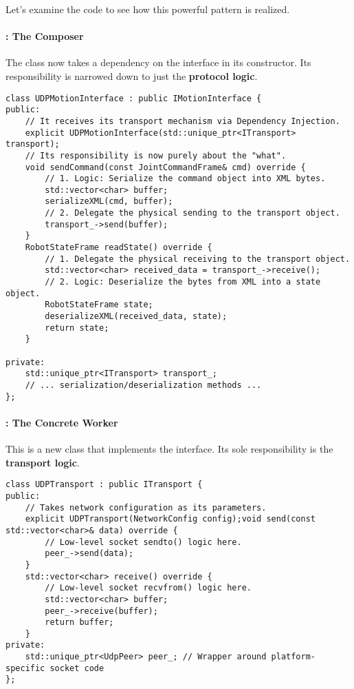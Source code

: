 Let's examine the code to see how this powerful pattern is realized.

\paragraph{: The Composer}
The  class now takes a dependency on the  interface in its constructor. Its responsibility is narrowed down to just the \textbf{protocol logic}.

\begin{verbatim}
class UDPMotionInterface : public IMotionInterface {
public:
    // It receives its transport mechanism via Dependency Injection.
    explicit UDPMotionInterface(std::unique_ptr<ITransport> transport);
    // Its responsibility is now purely about the "what".
    void sendCommand(const JointCommandFrame& cmd) override {
        // 1. Logic: Serialize the command object into XML bytes.
        std::vector<char> buffer;
        serializeXML(cmd, buffer);
        // 2. Delegate the physical sending to the transport object.
        transport_->send(buffer);
    }
    RobotStateFrame readState() override {
        // 1. Delegate the physical receiving to the transport object.
        std::vector<char> received_data = transport_->receive();
        // 2. Logic: Deserialize the bytes from XML into a state object.
        RobotStateFrame state;
        deserializeXML(received_data, state);
        return state;
    }
    
private:
    std::unique_ptr<ITransport> transport_;
    // ... serialization/deserialization methods ...
};
\end{verbatim}
\label{lst:udpmotioninterface-composer}

\paragraph{: The Concrete Worker}
This is a new class that implements the  interface. Its sole responsibility is the \textbf{transport logic}. 

\begin{verbatim}
class UDPTransport : public ITransport {
public:
    // Takes network configuration as its parameters.
    explicit UDPTransport(NetworkConfig config);void send(const std::vector<char>& data) override {
        // Low-level socket sendto() logic here.
        peer_->send(data);
    }
    std::vector<char> receive() override {
        // Low-level socket recvfrom() logic here.
        std::vector<char> buffer;
        peer_->receive(buffer);
        return buffer;
    }
private:
    std::unique_ptr<UdpPeer> peer_; // Wrapper around platform-specific socket code
};
\end{verbatim}
\vspace{0.3cm}
\label{lst:udptransport-implementation}

